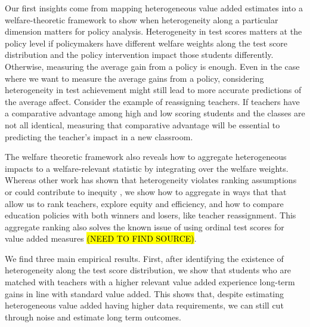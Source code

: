\documentclass[12pt]{article}
\theoremstyle{definition}
\theoremstyle{definition}
\theoremstyle{definition}
\theoremstyle{definition}
\begin{document}
    Our first insights come from mapping heterogeneous value added estimates into a welfare-theoretic framework to show when heterogeneity along a particular dimension matters for policy analysis. Heterogeneity in test scores matters at the policy level if policymakers have different welfare weights along the test score distribution and the policy intervention impact those students differently. Otherwise, measuring the average gain from a policy is enough. Even in the case where we want to measure the average gains from a policy, considering heterogeneity in test achievement might still lead to more accurate predictions of the average affect. Consider the example of reassigning teachers. If teachers have a comparative advantage among high and low scoring students and the classes are not all identical, measuring that comparative advantage will be essential to predicting the teacher's impact in a new classroom.
    
    The welfare theoretic framework also reveals how to aggregate heterogeneous impacts to a welfare-relevant statistic by integrating over the welfare weights. Whereas other work has shown that heterogeneity violates ranking assumptions \citep{condie2014teacher} or could contribute to inequity \citep{Delgado2020,bates2022teacher}, we show how to aggregate in ways that that allow us to rank teachers, explore equity and efficiency, and how to compare education policies with both winners and losers, like teacher reassignment. This aggregate ranking also solves the known issue of using ordinal test scores for value added measures \hl{(NEED TO FIND SOURCE)}. 
    
    We find three main empirical results. First, after identifying the existence of heterogeneity along the test score distribution, we show that students who are matched with teachers with a higher relevant value added experience long-term gains in line with standard value added. This shows that, despite estimating heterogeneous value added having higher data requirements, we can still cut through noise and estimate long term outcomes.
    
\end{document}
